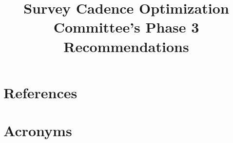 \documentclass[PST,authoryear,toc]{lsstdoc}%
\title{Survey Cadence Optimization Committee’s Phase 3 Recommendations}
\date{\vcsDate}
\begin{document}
\maketitle



\clearpage

\clearpage

\clearpage

\clearpage

\clearpage

%


\appendix


\section{References} \label{sec:bib}
\renewcommand{\refname}{} %


\section{Acronyms} \label{sec:acronyms}

\end{document}
